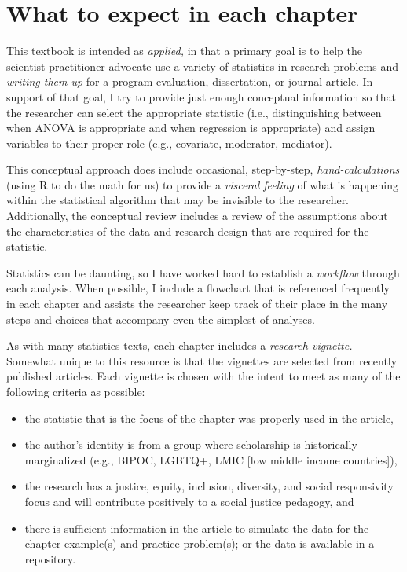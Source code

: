\documentclass[
  11pt,
]{book}
\providecommand{\tightlist}{%
  \setlength{\itemsep}{0pt}\setlength{\parskip}{0pt}}
\begin{document}
\hypertarget{what-to-expect-in-each-chapter}{%
\section{What to expect in each chapter}\label{what-to-expect-in-each-chapter}}

This textbook is intended as \emph{applied,} in that a primary goal is to help the scientist-practitioner-advocate use a variety of statistics in research problems and \emph{writing them up} for a program evaluation, dissertation, or journal article. In support of that goal, I try to provide just enough conceptual information so that the researcher can select the appropriate statistic (i.e., distinguishing between when ANOVA is appropriate and when regression is appropriate) and assign variables to their proper role (e.g., covariate, moderator, mediator).

This conceptual approach does include occasional, step-by-step, \emph{hand-calculations} (using R to do the math for us) to provide a \emph{visceral feeling} of what is happening within the statistical algorithm that may be invisible to the researcher. Additionally, the conceptual review includes a review of the assumptions about the characteristics of the data and research design that are required for the statistic.

Statistics can be daunting, so I have worked hard to establish a \emph{workflow} through each analysis. When possible, I include a flowchart that is referenced frequently in each chapter and assists the researcher keep track of their place in the many steps and choices that accompany even the simplest of analyses.

As with many statistics texts, each chapter includes a \emph{research vignette.} Somewhat unique to this resource is that the vignettes are selected from recently published articles. Each vignette is chosen with the intent to meet as many of the following criteria as possible:

\begin{itemize}
\tightlist
\item
  the statistic that is the focus of the chapter was properly used in the article,
\item
  the author's identity is from a group where scholarship is historically marginalized (e.g., BIPOC, LGBTQ+, LMIC {[}low middle income countries{]}),
\item
  the research has a justice, equity, inclusion, diversity, and social responsivity focus and will contribute positively to a social justice pedagogy, and
\item
  there is sufficient information in the article to simulate the data for the chapter example(s) and practice problem(s); or the data is available in a repository.
\end{itemize}
\end{document}

